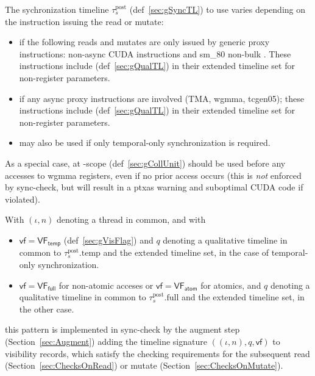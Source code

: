 The sychronization timeline $\tau_s^\mathrm{post}$ (def~\ref{sec:gSyncTL}) to use varies depending on the instruction issuing the read or mutate:
\begin{itemize}
  \item {} if the following reads and mutates are only issued by generic proxy instructions: non-async CUDA instructions and sm\_80 non-bulk .
  These instructions include  (def~\ref{sec:gQualTL}) in their extended timeline set for non-register parameters.
  \item {} if any async proxy instructions are involved (TMA, wgmma, tcgen05); these instructions include  (def~\ref{sec:gQualTL}) in their extended timeline set for non-register parameters.
  \item {} may also be used if only temporal-only synchronization is required.
\end{itemize}
As a special case,  at -scope (def~\ref{sec:gCollUnit}) should be used before any accesses to wgmma registers, even if no prior access occurs (this is \emph{not} enforced by sync-check, but will result in a ptxas warning and suboptimal CUDA code if violated).

With $(\iota, n)$ denoting a thread in common, and with
\begin{itemize}
    \item $\mathsf{vf} = \mathsf{VF_{temp}}$ (def~\ref{sec:gVisFlag}) and $q$ denoting a qualitative timeline in common to $\tau_s^\mathrm{post}.\mathrm{temp}$ and the extended timeline set, in the case of temporal-only synchronization.
    \item $\mathsf{vf} = \mathsf{VF_{full}}$ for non-atomic acceses or $\mathsf{vf} = \mathsf{VF_{atom}}$ for atomics, and $q$ denoting a qualitative timeline in common to $\tau_s^\mathrm{post}.\mathrm{full}$ and the extended timeline set, in the other case.
\end{itemize}
this pattern is implemented in sync-check by the augment step (Section~\ref{sec:Augment}) adding the timeline signature $((\iota, n), q, \mathsf{vf})$ to visibility records, which satisfy the checking requirements for the subsequent read (Section~\ref{sec:ChecksOnRead}) or mutate (Section~\ref{sec:ChecksOnMutate}).


